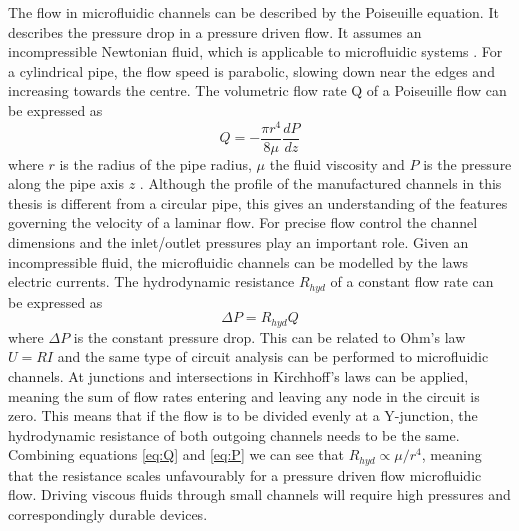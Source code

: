 \documentclass[final]{jyflluk}
\begin{document}
The flow in microfluidic channels can be described by the Poiseuille equation. It describes the pressure drop in a pressure driven flow. It assumes an incompressible Newtonian fluid, which is applicable to microfluidic systems \cite{borovsky}. For a cylindrical pipe, the flow speed is parabolic, slowing down near the edges and increasing towards the centre. The volumetric flow rate Q of a Poiseuille flow can be expressed as
%
\begin{equation}
    \label{eq:Q}
    Q = -\frac{\pi r^4}{8 \mu} \frac{dP}{dz}
 \end{equation}
 where $r$ is the radius of the pipe radius, $\mu$ the fluid viscosity and $P$ is the pressure along the pipe axis $z$ \cite{tian2008introduction}. Although the profile of the manufactured channels in this thesis is different from a circular pipe, this gives an understanding of the features governing the velocity of a laminar flow. For precise flow control the channel dimensions and the inlet/outlet pressures play an important role. 
 Given an incompressible fluid, the microfluidic channels can be modelled by the laws electric currents. The hydrodynamic resistance $R_{hyd}$ of a constant flow rate can be expressed as 
 \begin{equation}
     \label{eq:P}
     \Delta P = R_{hyd} Q
  \end{equation}
 where $\Delta P$ is the constant pressure drop. This can be related to Ohm’s law $U=RI$ and the same type of circuit analysis can be performed to microfluidic channels. At junctions and intersections in Kirchhoff’s laws can be applied, meaning the sum of flow rates entering and leaving any node in the circuit is zero. This means that if the flow is to be divided evenly at a Y-junction, the hydrodynamic resistance of both outgoing channels needs to be the same. \cite{bruus2008theoretical}
 Combining equations \ref{eq:Q} and \ref{eq:P} we can see that $R_{hyd} \propto \mu/r^4$, meaning that the resistance scales unfavourably for a pressure driven flow microfluidic flow. Driving viscous fluids through small channels will require high pressures and correspondingly durable devices.
 
 
\end{document}
